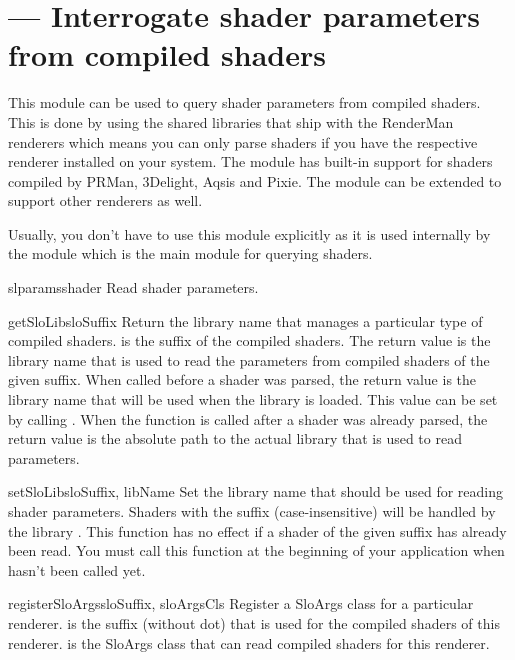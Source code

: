 
\section{ ---
         Interrogate shader parameters from compiled shaders}

This module can be used to query shader parameters from compiled shaders.
This is done by using the shared libraries that ship with the
RenderMan renderers which means you can only parse shaders if
you have the respective renderer installed on your system. The module has
built-in support for shaders compiled by PRMan, 3Delight, Aqsis and
Pixie. The module can be extended to support other renderers as well.

Usually, you don't have to use this module explicitly as it is used internally
by the  module which is the main module for querying shaders.

\begin{funcdesc}{slparams}{shader}
Read shader parameters.
\end{funcdesc}

\begin{funcdesc}{getSloLib}{sloSuffix}
Return the library name that manages a particular type of compiled shaders.
 is the suffix of the compiled shaders.
The return value is the library name that is used to read the parameters
from compiled shaders of the given suffix. When called before a shader
was parsed, the return value is the library name that will be used when
the library is loaded. This value can be set by calling
. When the function is called after a shader was already parsed, the
return value is the absolute path to the actual library that is used
to read parameters.
\end{funcdesc}

\begin{funcdesc}{setSloLib}{sloSuffix, libName}
Set the library name that should be used for reading shader parameters.
Shaders with the suffix  (case-insensitive) will be handled by
the library . This function has no effect if a shader
of the given suffix has already been read. You must call this function at the beginning
of your application when  hasn't been called yet.
\end{funcdesc}

\begin{funcdesc}{registerSloArgs}{sloSuffix, sloArgsCls}
Register a SloArgs class for a particular renderer.
 is the suffix (without dot) that is used for the compiled
shaders of this renderer.  is the SloArgs class that
can read compiled shaders for this renderer.
\end{funcdesc}
